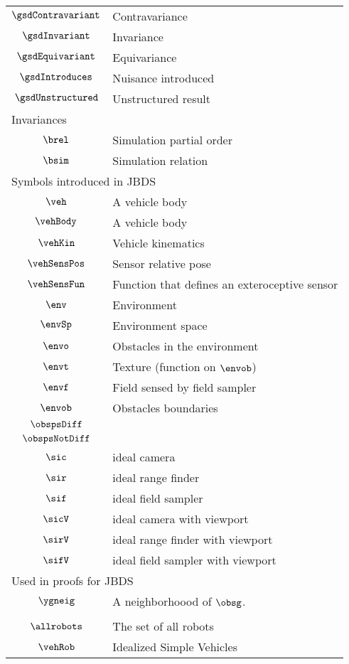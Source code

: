 \begin{longtable}{cl}
 \hline
$\gsdContravariant$ &  Contravariance\\ 
 $\gsdInvariant$ &  Invariance\\ 
 $\gsdEquivariant$ &  Equivariance\\ 
 $\gsdIntroduces$ &  Nuisance introduced\\ 
 $\gsdUnstructured$ &  Unstructured result\\ 
 \multicolumn{2}{l}{Invariances}\\ 
 \hline
$\brel$ &  Simulation partial order\\ 
 $\bsim$ &  Simulation relation\\ 
 \multicolumn{2}{l}{Symbols introduced in JBDS}\\ 
 \hline
$\veh$ &  A vehicle body\\ 
 $\vehBody$ &  A vehicle body\\ 
 $\vehKin$ &  Vehicle kinematics \\ 
 $\vehSensPos$ &  Sensor relative pose\\ 
 $\vehSensFun$ &  Function that defines an exteroceptive sensor\\ 
 $\env$ &  Environment\\ 
 $\envSp$ &  Environment space\\ 
 $\envo$ &  Obstacles in the environment\\ 
 $\envt$ &  Texture (function on $\envob$)\\ 
 $\envf$ &  Field sensed by field sampler\\ 
 $\envob$ &  Obstacles boundaries\\ 
 $\obspsDiff$ & \\ 
 $\obspsNotDiff$ & \\ 
 $\sic$ &  ideal camera\\ 
 $\sir$ &  ideal range finder\\ 
 $\sif$ &  ideal field sampler\\ 
 $\sicV$ &  ideal camera with viewport\\ 
 $\sirV$ &  ideal range finder with viewport\\ 
 $\sifV$ &  ideal field sampler with viewport\\ 
 \multicolumn{2}{l}{Used in proofs for JBDS}\\ 
 \hline
$\ygneig$ &  A neighborhoood of $\obsg$.\\ 
 \multicolumn{2}{l}{}\\ 
 \hline
$\allrobots$ &  The set of all robots\\ 
 $\vehRob$ &  Idealized Simple Vehicles\\ 

\end{longtable}

